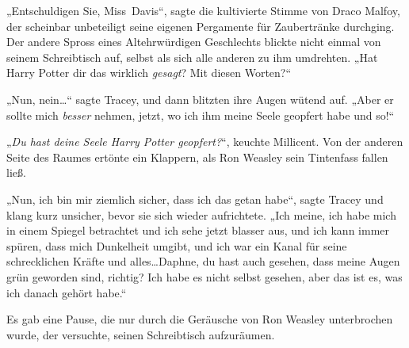 „Entschuldigen Sie, Miss~Davis“, sagte die kultivierte Stimme von Draco Malfoy, der scheinbar unbeteiligt seine eigenen Pergamente für Zaubertränke durchging. Der andere Spross eines Altehrwürdigen Geschlechts blickte nicht einmal von seinem Schreibtisch auf, selbst als sich alle anderen zu ihm umdrehten.
„Hat Harry Potter dir das wirklich \emph{gesagt}? Mit diesen Worten?“

„Nun, nein…“ sagte Tracey, und dann blitzten ihre Augen wütend auf.
„Aber er sollte mich \emph{besser} nehmen, jetzt, wo ich ihm meine Seele geopfert habe und so!“

„\emph{Du hast deine Seele Harry Potter geopfert?}“, keuchte Millicent. Von der anderen Seite des Raumes ertönte ein Klappern, als Ron Weasley sein Tintenfass fallen ließ.

„Nun, ich bin mir ziemlich sicher, dass ich das getan habe“, sagte Tracey und klang kurz unsicher, bevor sie sich wieder aufrichtete.
„Ich meine, ich habe mich in einem Spiegel betrachtet und ich sehe jetzt blasser aus, und ich kann immer spüren, dass mich Dunkelheit umgibt, und ich war ein Kanal für seine schrecklichen Kräfte und alles…Daphne, du hast auch gesehen, dass meine Augen grün geworden sind, richtig? Ich habe es nicht selbst gesehen, aber das ist es, was ich danach gehört habe.“

Es gab eine Pause, die nur durch die Geräusche von Ron Weasley unterbrochen wurde, der versuchte, seinen Schreibtisch aufzuräumen.


